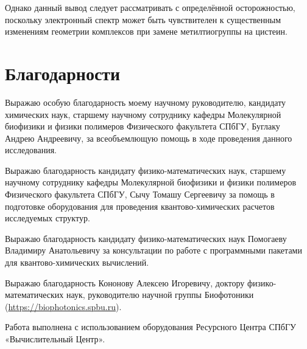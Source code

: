 \documentclass[a4paper,12pt]{article}
\begin{document}
\begin{onehalfspace}
	Однако данный вывод следует рассматривать с определённой осторожностью, поскольку электронный спектр может быть чувствителен к существенным изменениям геометрии комплексов при замене метилтиогруппы на цистеин. 
	
	\newpage
	
	\section*{Благодарности}
	
	Выражаю особую благодарность моему научному руководителю, кандидату химических наук, старшему научному сотруднику кафедры Молекулярной биофизики и физики полимеров Физического факультета СПбГУ, Буглаку Андрею Андреевичу, за всеобъемлющую помощь в ходе проведения данного исследования.
	
	Выражаю благодарность кандидату физико-математических наук, старшему научному сотруднику кафедры Молекулярной биофизики и физики полимеров Физического факультета СПбГУ, Сычу Томашу Сергеевичу за помощь в подготовке оборудования для проведения квантово-химических расчетов исследуемых структур. 
	
	Выражаю благодарность кандидату физико-математических наук Помогаеву Владимиру Анатольевичу за консультации по работе с программными пакетами для квантово-химических вычислений.
	
	Выражаю благодарность Кононову Алексею Игоревичу, доктору физико-математических наук, руководителю научной группы Биофотоники (\href{https://biophotonics.spbu.ru}{https://biophotonics.spbu.ru}).
	
	Работа выполнена с использованием оборудования Ресурсного Центра СПбГУ «Вычислительный Центр».
	
	\newpage
	
%	
	\printbibliography[title={Список использованных литературных источников и информационных материалов}]
	
	\newpage
	

\end{onehalfspace}
\end{document}
